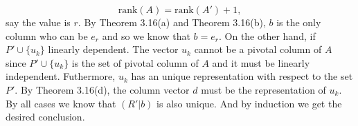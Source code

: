 \begin{enumerate}
\[\mathrm{rank}(A)=\mathrm{rank}(A')+1,\]
say the value is $r$.
By Theorem 3.16(a) and Theorem 3.16(b), $b$ is the only column who can be $e_r$ and so we know that $b=e_r$. On the other hand, if $P'\cup\{u_k\}$ linearly dependent. The vector $u_k$ cannot be a pivotal column of $A$ since $P'\cup\{u_k\}$ is the set of pivotal column of $A$ and it must be linearly independent. Futhermore, $u_k$ has an unique representation with respect to the set $P'$. By Theorem 3.16(d), the column vector $d$ must be the representation of $u_k$. By all cases we know that $(R'|b)$ is also unique. And by induction we get the desired conclusion.
\end{enumerate}